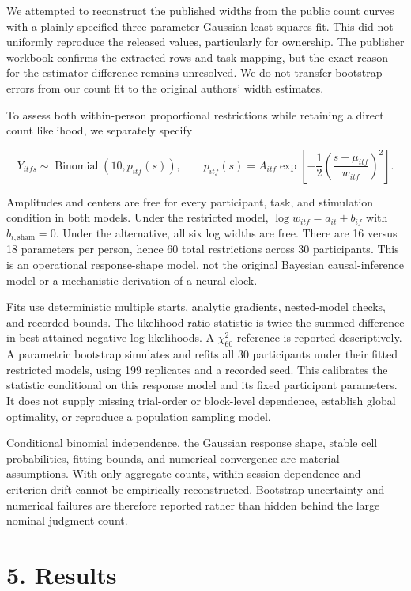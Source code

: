 \documentclass[
  11pt,
]{article}
\let\ctdoldsection\section
\renewcommand{\section}{\Needspace{8\baselineskip}\ctdoldsection}
\begin{document}
We attempted to reconstruct the published widths from the public count
curves with a plainly specified three-parameter Gaussian least-squares
fit. This did not uniformly reproduce the released values, particularly
for ownership. The publisher workbook confirms the extracted rows and
task mapping, but the exact reason for the estimator difference remains
unresolved. We do not transfer bootstrap errors from our count fit to
the original authors' width estimates.

To assess both within-person proportional restrictions while retaining a
direct count likelihood, we separately specify

\[
Y_{itfs}\sim\operatorname{Binomial}(10,p_{itf}(s)),\qquad
p_{itf}(s)=A_{itf}\exp\left[-\frac12
\left(\frac{s-\mu_{itf}}{w_{itf}}\right)^2\right].
\]

Amplitudes and centers are free for every participant, task, and
stimulation condition in both models. Under the restricted model,
\(\log w_{itf}=a_{it}+b_{if}\) with \(b_{i,\mathrm{sham}}=0\). Under the
alternative, all six log widths are free. There are 16 versus 18
parameters per person, hence 60 total restrictions across 30
participants. This is an operational response-shape model, not the
original Bayesian causal-inference model or a mechanistic derivation of
a neural clock.

Fits use deterministic multiple starts, analytic gradients, nested-model
checks, and recorded bounds. The likelihood-ratio statistic is twice the
summed difference in best attained negative log likelihoods. A
\(\chi^2_{60}\) reference is reported descriptively. A parametric
bootstrap simulates and refits all 30 participants under their fitted
restricted models, using 199 replicates and a recorded seed. This
calibrates the statistic conditional on this response model and its
fixed participant parameters. It does not supply missing trial-order or
block-level dependence, establish global optimality, or reproduce a
population sampling model.

Conditional binomial independence, the Gaussian response shape, stable
cell probabilities, fitting bounds, and numerical convergence are
material assumptions. With only aggregate counts, within-session
dependence and criterion drift cannot be empirically reconstructed.
Bootstrap uncertainty and numerical failures are therefore reported
rather than hidden behind the large nominal judgment count.

\hypertarget{results}{%
\section{5. Results}\label{results}}
\end{document}
